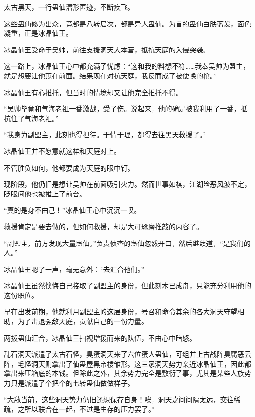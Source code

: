 
\begin{this_body}



太古黑天，一行蛊仙潜形匿迹，不断疾飞。

这些蛊仙修为出众，竟都是八转层次，都是异人蛊仙。为首的蛊仙白肤蓝发，面色凝重，正是冰晶仙王。

冰晶仙王受命于吴帅，前往支援洞天大本营，抵抗天庭的入侵突袭。

这一路上，冰晶仙王心中都充满了忧虑：“这和我的料想不符……我奉吴帅为盟主，就是想要让他顶在前面。结果现在对抗天庭，我反而成了被使唤的枪。”

冰晶仙王有心推托，但当时的情境却又让他完全推托不得。

“吴帅毕竟和气海老祖一番激战，受了伤。说起来，他的确是被我利用了一番，抵抗住了气海老祖。”

“我身为副盟主，此刻也得担待。于情于理，都得去往黑天救援了。”

冰晶仙王并不愿意就这样和天庭对上。

不管胜负如何，他都要成为天庭的眼中钉。

现阶段，他仍旧是想让吴帅在前面吸引火力。然而世事如棋，江湖险恶风波不定，眨眼间他也被推上了前台。

“真的是身不由己！”冰晶仙王心中沉沉一叹。

救援肯定是要去做的，但如何救援，却是大可琢磨推敲的内容了。

“副盟主，前方发现大量蛊仙。”负责侦查的蛊仙忽然开口，然后继续道，“是我们的人。”

冰晶仙王嗯了一声，毫无意外：“去汇合他们。”

冰晶仙王虽然懊悔自己接取了副盟主的身份，但此刻木已成舟，只能充分利用他的这份职位。

早在出发前期，他就利用副盟主的这层身份，号召和命令其余的各大洞天守望相助，为了击退强敌天庭，贡献自己的一份力量。

两拨蛊仙汇合，冰晶仙王扫视增援而来的队伍，不由心中暗怒。

乱石洞天派遣了太古石怪，臭蛋洞天来了六位蛋人蛊仙，可组并上古战阵臭腐恶云阵，毛怪洞天则拿出了仙蛊屋黑帝楼雏形。这三家洞天势力亲近冰晶仙王，因此都拿出来压箱底的本钱。但除此之外，其余势力完全是敷衍了事，尤其是某些人族势力只是派遣了个把个的七转蛊仙做做样子。

“大敌当前，这些洞天势力仍旧还想保存自身！唉，洞天之间间隔太远，交往稀疏，之所以联合在一起，不过是生存的压力罢了。”


\end{this_body}
